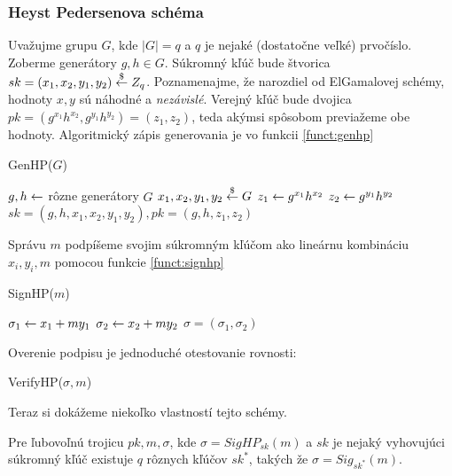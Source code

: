 \subsubsection{Heyst Pedersenova schéma}

Uvažujme grupu $G$, kde $|G| = q$ a $q$ je nejaké (dostatočne veľké) prvočíslo.
Zoberme generátory $g, h \in G$.
Súkromný kľúč bude štvorica  $sk = (x_1, x_2, y_1, y_2) \overset{\$}{\leftarrow} Z_q$.
Poznamenajme, že narozdiel od ElGamalovej schémy, hodnoty $x,y$ sú
náhodné a \emph{nezávislé}.
Verejný kľúč bude dvojica
$pk = (g^{x_1} h^{x_2}, g^{y_1} h^{y_2}) = (z_1, z_2)$, teda akýmsi
spôsobom previažeme obe hodnoty. Algoritmický zápis generovania je vo
funkcii \ref{funct:genhp}

\begin{function}[h!]
    \caption{GenHP($G$)}
    \label{funct:genhp}
    $g,h \leftarrow $ rôzne generátory $G$\;
    $x_1,x_2,y_1,y_2 \overset{\$}{\leftarrow} G$\;
    $z_1 \leftarrow g^{x_1} h^{x_2}$\;
    $z_2 \leftarrow g^{y_1} h^{y_2}$\;
    \Return $sk=(g,h,x_1,x_2,y_1,y_2), pk=(g,h,z_1,z_2)$\;
\end{function}

Správu $m$ podpíšeme svojim súkromným kľúčom ako lineárnu kombináciu
$x_i, y_i, m$ pomocou funkcie \ref{funct:signhp}
\begin{function}[h!]
    \caption{SignHP($m$)}
    \label{funct:signhp}
    $\sigma_1 \leftarrow x_1 + m y_1$\;
    $\sigma_2 \leftarrow x_2 + m y_2$\;
    \Return $\sigma=(\sigma_1,\sigma_2)$\;
\end{function}

Overenie podpisu je jednoduché otestovanie
rovnosti:
\begin{function}[h!]
    \caption{VerifyHP($\sigma,m$)}
\end{function}

Teraz si dokážeme niekoľko vlastností tejto schémy.

\begin{lema}
Pre ľubovoľnú trojicu $pk, m, \sigma$, kde $\sigma = SigHP_{sk}(m)$
a $sk$ je nejaký vyhovujúci súkromný kľúč
existuje $q$ rôznych kľúčov $sk^*$, takých že $\sigma = Sig_{sk^*}(m)$.
\end{lema}

